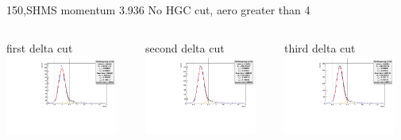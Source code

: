 \documentclass[aspectratio=169,xcolor=dvipsnames]{beamer}
\begin{document}
\begin{frame}{150,SHMS momentum 3.936}
No HGC cut, aero greater than 4
\begin{columns}
\begin{column}[T]{0.3\textwidth}
first delta cut \\
\includegraphics[width = 0.9\textwidth]{results/pid/rftime/rftime_neg_150_0_pi.pdf}
\end{column}
\begin{column}[T]{0.3\textwidth}
second delta cut \\
\includegraphics[width = 0.9\textwidth]{results/pid/rftime/rftime_neg_150_1_pi.pdf}
\end{column}
\begin{column}[T]{0.3\textwidth}
third delta cut \\
\includegraphics[width = 0.9\textwidth]{results/pid/rftime/rftime_neg_150_2_pi.pdf}

\end{column}
\end{columns}
\end{frame}
\end{document}
